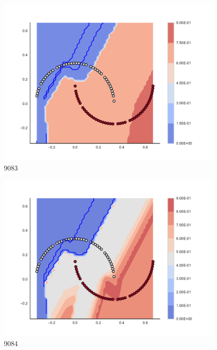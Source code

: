 \begin{subfigure}[b]{0.09\textwidth}
    \includegraphics[clip, trim=2.35cm 1.75cm 4.5cm 0cm,width=\textwidth]{img/convergence/9083.pdf}
    \caption{9083}
    \label{fig:convergence_9083}
\end{subfigure}
%
\begin{subfigure}[b]{0.09\textwidth}
    \includegraphics[clip, trim=2.35cm 1.75cm 4.5cm 0cm,width=\textwidth]{img/convergence/9084.pdf}
    \caption{9084}
    \label{fig:convergence_9084}
\end{subfigure}
%

